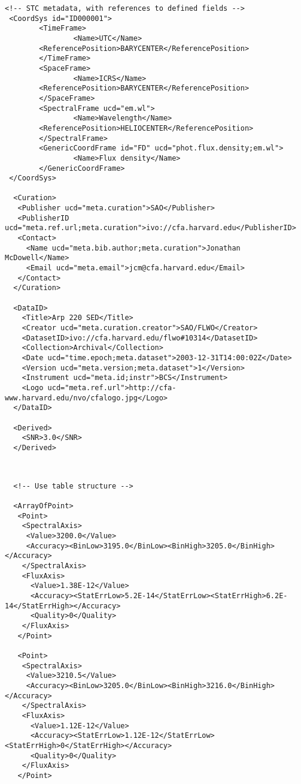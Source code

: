 {\begin{flushleft}
\begin{fmpage}
\begin{verbatim}
<!-- STC metadata, with references to defined fields -->
 <CoordSys id="ID000001">
        <TimeFrame>
                <Name>UTC</Name>
		<ReferencePosition>BARYCENTER</ReferencePosition>
        </TimeFrame>
        <SpaceFrame>
                <Name>ICRS</Name>
		<ReferencePosition>BARYCENTER</ReferencePosition>
        </SpaceFrame>
        <SpectralFrame ucd="em.wl">
                <Name>Wavelength</Name>
		<ReferencePosition>HELIOCENTER</ReferencePosition>
        </SpectralFrame>
        <GenericCoordFrame id="FD" ucd="phot.flux.density;em.wl">
                <Name>Flux density</Name>
        </GenericCoordFrame>
 </CoordSys>

  <Curation>
   <Publisher ucd="meta.curation">SAO</Publisher>
   <PublisherID ucd="meta.ref.url;meta.curation">ivo://cfa.harvard.edu</PublisherID>   
   <Contact>
     <Name ucd="meta.bib.author;meta.curation">Jonathan McDowell</Name>
     <Email ucd="meta.email">jcm@cfa.harvard.edu</Email>
   </Contact>
  </Curation>

  <DataID>
    <Title>Arp 220 SED</Title>
    <Creator ucd="meta.curation.creator">SAO/FLWO</Creator>
    <DatasetID>ivo://cfa.harvard.edu/flwo#10314</DatasetID>
    <Collection>Archival</Collection>
    <Date ucd="time.epoch;meta.dataset">2003-12-31T14:00:02Z</Date>
    <Version ucd="meta.version;meta.dataset">1</Version>
    <Instrument ucd="meta.id;instr">BCS</Instrument>
    <Logo ucd="meta.ref.url">http://cfa-www.harvard.edu/nvo/cfalogo.jpg</Logo>
  </DataID>

  <Derived>
    <SNR>3.0</SNR>
  </Derived>


\end{verbatim}
\end{fmpage}

\begin{fmpage}
\begin{verbatim}

  <!-- Use table structure -->

  <ArrayOfPoint>
   <Point>
    <SpectralAxis>
     <Value>3200.0</Value>
     <Accuracy><BinLow>3195.0</BinLow><BinHigh>3205.0</BinHigh></Accuracy>
    </SpectralAxis>
    <FluxAxis>
      <Value>1.38E-12</Value>
      <Accuracy><StatErrLow>5.2E-14</StatErrLow><StatErrHigh>6.2E-14</StatErrHigh></Accuracy>
      <Quality>0</Quality>
    </FluxAxis>
   </Point>

   <Point>
    <SpectralAxis>
     <Value>3210.5</Value>
     <Accuracy><BinLow>3205.0</BinLow><BinHigh>3216.0</BinHigh></Accuracy>
    </SpectralAxis>
    <FluxAxis>
      <Value>1.12E-12</Value>
      <Accuracy><StatErrLow>1.12E-12</StatErrLow><StatErrHigh>0</StatErrHigh></Accuracy>
      <Quality>0</Quality>
    </FluxAxis>
   </Point>


\end{verbatim}
\end{fmpage}
\end{flushleft}}
